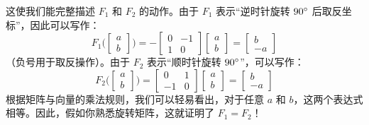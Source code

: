 \begin{example}
   这使我们能完整描述 $F_1$ 和 $F_2$ 的动作。由于 $F_1$ 表示``逆时针旋转 $90 ^\circ$ 后取反坐标''，因此可以写作：
    \[F_1\Bigg(\begin{bmatrix}
        a \\
        b
     \end{bmatrix}\Bigg) = -\begin{bmatrix}
        0 & -1 \\
        1 & 0
     \end{bmatrix}\begin{bmatrix}
        a \\
        b
     \end{bmatrix}=\begin{bmatrix}
        b \\
        -a
     \end{bmatrix}\]
     （负号用于取反操作）。由于 $F_2$ 表示``顺时针旋转 $90 ^\circ$''，可以写作：
     \[F_2\Bigg(\begin{bmatrix}
        a \\
        b
     \end{bmatrix}\Bigg) = \begin{bmatrix}
        0 & 1 \\
        -1 & 0
     \end{bmatrix}\begin{bmatrix}
        a \\
        b
     \end{bmatrix}=\begin{bmatrix}
        b \\
        -a
     \end{bmatrix}\]
     根据矩阵与向量的乘法规则，我们可以轻易看出，对于任意 $a$ 和 $b$，这两个表达式相等。因此，假如你熟悉旋转矩阵，这就证明了 $F_1 = F_2$！
\end{example}